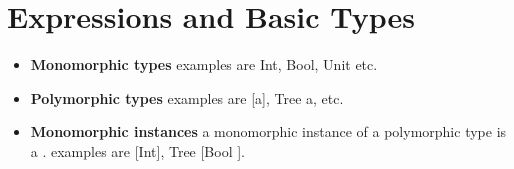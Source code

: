 
\chapter{Expressions and Basic Types}




\begin{itemize}   
\renewcommand{\labelitemi}{$\Box$}
\item \textbf{Monomorphic types} examples are Int, Bool, Unit etc.
\item \textbf{Polymorphic types} examples are [a], Tree a, etc.
\item \textbf{Monomorphic instances} a monomorphic instance 
of a polymorphic type is a . examples are [Int], Tree [Bool ].
\end{itemize}